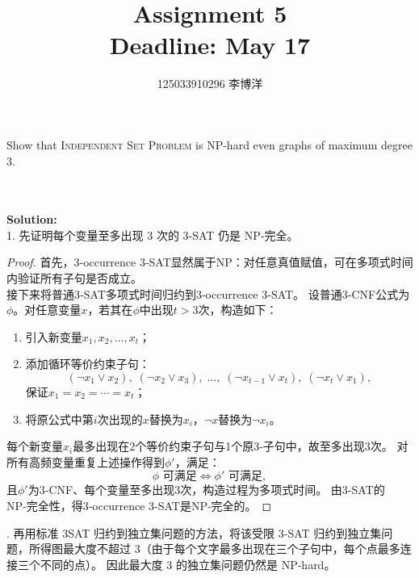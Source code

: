 \documentclass{article}
\title{{\bf Assignment 5} \\ {\large Deadline: May 17}}
\author{125033910296 李博洋}
\date{}
\newcounter{exercise}
\newcommand{\<}{
    \langle}
\renewcommand{\>}{
    \rangle}
\begin{document}
\maketitle


{\large



\begin{exercise}
Show that \textsc{Independent Set Problem} is NP-hard even graphs of maximum degree $3$.
\end{exercise}
\\\\
\noindent\textbf{Solution:}
\\
1. 先证明每个变量至多出现 3 次的 3‑SAT 仍是 NP‑完全。
\begin{proof}
首先，3‑occurrence 3‑SAT显然属于NP：对任意真值赋值，可在多项式时间内验证所有子句是否成立。
\\
接下来将普通3‑SAT多项式时间归约到3‑occurrence 3‑SAT。
设普通3‑CNF公式为$\phi$。对任意变量$x$，若其在$\phi$中出现$t>3$次，构造如下：
\begin{enumerate}
    \item 引入新变量$x_1,x_2,\dots,x_t$；
    \item 添加循环等价约束子句：
    \[
    (\neg x_1\lor x_2),\;(\neg x_2\lor x_3),\;\dots,\;(\neg x_{t-1}\lor x_t),\;(\neg x_t\lor x_1),
    \]
    保证$x_1=x_2=\cdots=x_t$；
    \item 将原公式中第$i$次出现的$x$替换为$x_i$，$\neg x$替换为$\neg x_i$。
\end{enumerate}
每个新变量$x_i$最多出现在2个等价约束子句与1个原3‑子句中，故至多出现3次。
对所有高频变量重复上述操作得到$\phi'$，满足：
\[
\phi\text{ 可满足} \iff \phi'\text{ 可满足},
\]
且$\phi'$为3‑CNF、每个变量至多出现3次，构造过程为多项式时间。
由3‑SAT的NP‑完全性，得3‑occurrence 3‑SAT是NP‑完全的。
\end{proof}

. 再用标准 3SAT 归约到独立集问题的方法，将该受限 3‑SAT 归约到独立集问题，所得图最大度不超过 3（由于每个文字最多出现在三个子句中，每个点最多连接三个不同的点）。
因此最大度 3 的独立集问题仍然是 NP‑hard。

}
\end{document}
